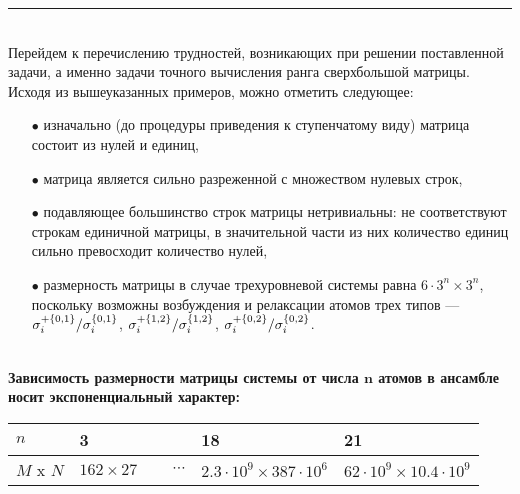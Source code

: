 \medskip\hrule\medskip
\
\\[12pt]
\noindent Перейдем к перечислению трудностей, возникающих при решении поставленной задачи, а именно задачи точного вычисления ранга сверхбольшой матрицы.\\Исходя из вышеуказанных примеров, можно отметить следующее:
\begin{itemize}
	\item[$\bullet$]{
		изначально (до процедуры приведения к ступенчатому виду) матрица состоит из нулей и единиц,}
	\item[$\bullet$]{
		матрица является сильно разреженной с множеством нулевых строк,}
	\item[$\bullet$]{
		подавляющее большинство строк матрицы нетривиальны: не соответствуют строкам единичной матрицы, в значительной части из них количество единиц сильно превосходит количество нулей,}
	\item[$\bullet$]{
		размерность матрицы в случае трехуровневой системы равна $6 \cdot 3^{n} \times 3^{n}$, поскольку возможны возбуждения и релаксации атомов трех типов --- $\sigma_{i}^{+\{0,1\}} / \sigma_{i}^{\{0,1\}}$, $\sigma_{i}^{+\{1,2\}} / \sigma_{i}^{\{1,2\}}$, $\sigma_{i}^{+\{0,2\}} / \sigma_{i}^{\{0,2\}}$.
	}
\end{itemize}
\
\\[0pt]
\noindent\textbf{Зависимость размерности матрицы системы от числа $\mathbf{n}$ атомов в ансамбле носит экспоненциальный характер:}

\noindent\begin{tabular}[t]{|p{4em}|p{5em}|p{4em}|p{9em}|p{9em}|}
	\hline
	$n$ & 3 &  & 18 & 21 \\
	\hline
	$M$ x $N$ & $162 \times 27$ & $\quad~\cdots$ & $2.3 \cdot 10^9 \times 387 \cdot 10^6$ & $62 \cdot 10^9 \times 10.4 \cdot 10^9$ \\
	\hline
\end{tabular}
\
\\[12pt]

